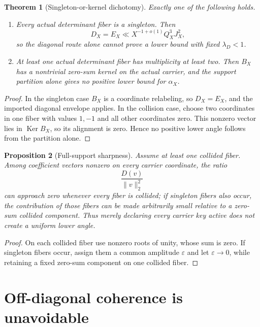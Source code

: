 \documentclass[11pt,a4paper]{article}
\newtheorem{theorem}{Theorem}[section]
\newtheorem{proposition}[theorem]{Proposition}
\theoremstyle{definition}
\theoremstyle{remark}
\newcommand{\Ker}{\operatorname{Ker}}
\begin{document}
\begin{theorem}[Singleton-or-kernel dichotomy]
\label{thm:dichotomy}
Exactly one of the following holds.
\begin{enumerate}[label=(\roman*),leftmargin=2.2em]
\item Every actual determinant fiber is a singleton.  Then
\[
 D_X=E_X\ll
 X^{-1+o(1)}Q_X^3J_X^2,
\]
so the diagonal route alone cannot prove a lower bound with fixed
\(\lambda_D<1\).
\item At least one actual determinant fiber has multiplicity at
least two.  Then \(B_X\) has a nontrivial zero-sum kernel on the
actual carrier, and the support partition alone gives no positive
lower bound for \(\alpha_X\).
\end{enumerate}
\end{theorem}

\begin{proof}
In the singleton case \(B_X\) is a coordinate relabeling, so
\(D_X=E_X\), and the imported diagonal envelope applies.
In the collision case, choose two coordinates in one fiber with
values \(1,-1\) and all other coordinates zero.  This nonzero vector
lies in \(\Ker B_X\), so its alignment is zero.  Hence no positive
lower angle follows from the partition alone.
\end{proof}

\begin{proposition}[Full-support sharpness]
\label{prop:full-support}
Assume at least one collided fiber.  Among coefficient vectors
nonzero on every carrier coordinate, the ratio
\[
 \frac{D(v)}{\|v\|_2^2}
\]
can approach zero whenever every fiber is collided; if singleton
fibers also occur, the contribution of those fibers can be made
arbitrarily small relative to a zero-sum collided component.
Thus merely declaring every carrier key active does not create a
uniform lower angle.
\end{proposition}

\begin{proof}
On each collided fiber use nonzero roots of unity, whose sum is zero.
If singleton fibers occur, assign them a common amplitude
\(\varepsilon\) and let \(\varepsilon\to0\), while retaining a fixed
zero-sum component on one collided fiber.
\end{proof}

\section{Off-diagonal coherence is unavoidable}
\end{document}
